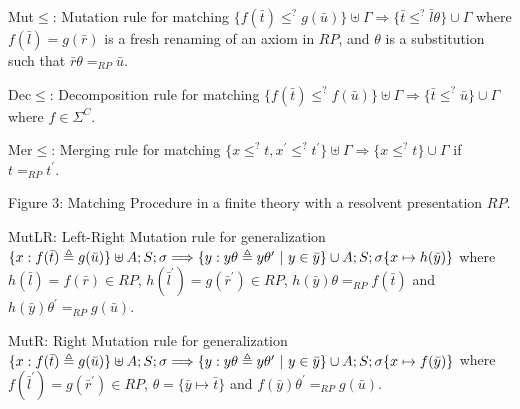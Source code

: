 \documentclass[10pt,a4paper]{amsart}
\begin{document}
    
\par
 
Mut\ensuremath{\leq}: Mutation rule for matching  $\{f(\bar{t})\leq^{?}g(\bar{u})\}\uplus\Gamma\Longrightarrow\{\bar{t}\leq^{?}\bar{l}\theta\}\cup\Gamma$ where $f(\bar{l})=g(\bar{r})$ is a fresh renaming of an axiom in $RP$, and $\theta$ is a substitution such that $\bar{r}\theta=_{RP}\bar{u}$.\par
     
\par
 
Dec\ensuremath{\leq}: Decomposition rule for matching  $\{f(\bar{t})\leq^{?}f(\bar{u})\}\uplus\Gamma\Longrightarrow\{\bar{t}\leq^{?}\bar{u}\}\cup\Gamma$ where $f\in{\Sigma}^{C}$.\par
      
\par
 
Mer\ensuremath{\leq}: Merging rule for matching  $\{x\leq^{?}t,x^{\prime}\leq^{?}t^{\prime}\}\uplus\Gamma\Longrightarrow\{x\leq^{?}t\}\cup\Gamma$ if $t=_{RP}t^{\prime}$.\par
    
Figure 3: Matching Procedure in a finite theory with a resolvent presentation $RP$.\par
 
 
    
\par
 
MutLR: Left-Right Mutation rule for generalization  $\{x:f(\bar{t})\triangleq g(\bar{u})\}\uplus A;S;\sigma\Longrightarrow\{y:y\theta\triangleq y\theta^{\prime}\leavevmode\nobreak\ |\leavevmode\nobreak\ y\in\bar{y}\}\cup A;S;\sigma\{x\mapsto h(\bar{y})\}$ where $h(\bar{l})=f(\bar{r})\in RP$, $h(\bar{l}^{\prime})=g(\bar{r}^{\prime})\in RP$, $h(\bar{y})\theta=_{RP}f(\bar{t})$ and $h(\bar{y})\theta^{\prime}=_{RP}g(\bar{u})$.\par
      
\par
 
MutR: Right Mutation rule for generalization  $\{x:f(\bar{t})\triangleq g(\bar{u})\}\uplus A;S;\sigma\Longrightarrow\{y:y\theta\triangleq y\theta^{\prime}\leavevmode\nobreak\ |\leavevmode\nobreak\ y\in\bar{y}\}\cup A;S;\sigma\{x\mapsto f(\bar{y})\}$ where $f(\bar{l}^{\prime})=g(\bar{r}^{\prime})\in RP$, $\theta=\{\bar{y}\mapsto\bar{t}\}$ and $f(\bar{y})\theta^{\prime}=_{RP}g(\bar{u})$.\par
      
\end{document}
